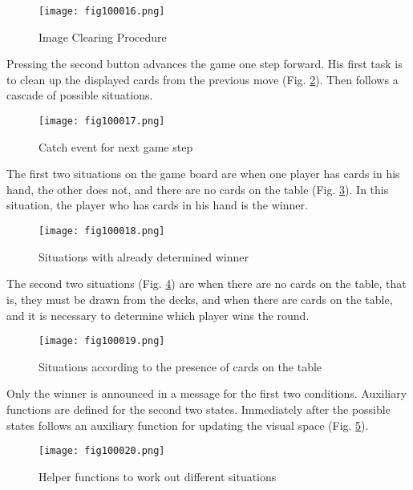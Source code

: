 \begin{figure}[H]
   \centering
   \texttt{[image: fig100016.png]}
   \caption{Image Clearing Procedure}
\label{fig100016}
\end{figure}

Pressing the second button advances the game one step forward. His first task is to clean up the displayed cards from the previous move (Fig. \ref{fig100017}). Then follows a cascade of possible situations.

\begin{figure}[H]
   \centering
   \texttt{[image: fig100017.png]}
   \caption{Catch event for next game step}
\label{fig100017}
\end{figure}

The first two situations on the game board are when one player has cards in his hand, the other does not, and there are no cards on the table (Fig. \ref{fig100018}). In this situation, the player who has cards in his hand is the winner.

\begin{figure}[H]
   \centering
   \texttt{[image: fig100018.png]}
   \caption{Situations with already determined winner}
\label{fig100018}
\end{figure}

The second two situations (Fig. \ref{fig100019}) are when there are no cards on the table, that is, they must be drawn from the decks, and when there are cards on the table, and it is necessary to determine which player wins the round.

\begin{figure}[H]
   \centering
   \texttt{[image: fig100019.png]}
   \caption{Situations according to the presence of cards on the table}
\label{fig100019}
\end{figure}

Only the winner is announced in a message for the first two conditions. Auxiliary functions are defined for the second two states. Immediately after the possible states follows an auxiliary function for updating the visual space (Fig. \ref{fig100020}).

\begin{figure}[H]
   \centering
   \texttt{[image: fig100020.png]}
   \caption{Helper functions to work out different situations}
\label{fig100020}
\end{figure}

